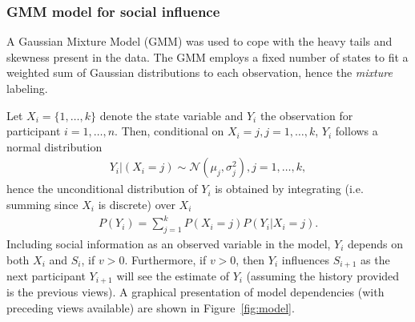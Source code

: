 \documentclass[9pt,a4paper,twocolumn,lineno]{article}
\begin{document}
%

\subsubsection*{GMM model for social influence}
A Gaussian Mixture Model (GMM) was used to cope with the heavy tails and skewness present in the data. The GMM employs a fixed number of states to fit a weighted sum of Gaussian distributions to each observation, hence the \emph{mixture} labeling.

Let $X_i=\{1,\dots,k\}$ denote the state variable and $Y_i$ the observation for participant $i=1,\dots,n$. Then, conditional on $X_i=j, j=1,\dots,k$, $Y_i$ follows a normal distribution
\begin{align*}
	Y_i|(X_i=j)  \sim \mathcal{N} (\mu_j,\sigma^2_j), j=1,\dots,k,
\end{align*}
hence the unconditional distribution of $Y_i$ is obtained by integrating (i.e. summing since $X_i$ is discrete) over $X_i$
\begin{align*}
	P(Y_i) = \sum_{j=1}^k P(X_i=j)P(Y_i|X_i=j).
\end{align*}
Including social information as an observed variable in the model, $Y_i$ depends on both $X_i$ and $S_i$, if $v>0$. Furthermore, if $v>0$, then $Y_i$ influences $S_{i+1}$ as the next participant $Y_{i+1}$ will see the estimate of $Y_i$ (assuming the history provided is the previous views). A graphical presentation of model dependencies (with preceding views available) are shown in Figure~\ref{fig:model}.
\end{document}
